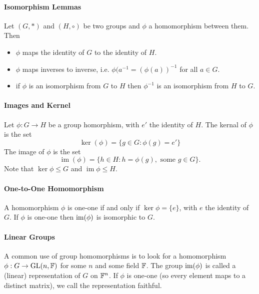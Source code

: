 \paragraph{Isomorphism Lemmas}
Let \((G, *)\) and \((H, \circ)\) be two groups and \(\phi\) a homomorphism between them. Then
\begin{itemize}
    \item \(\phi\) maps the identity of \(G\) to the identity of \(H\).
    \item \(\phi\) maps inverses to inverse, i.e. \(\phi(a^{-1} = (\phi(a))^{-1}\) for all \(a \in G\).
    \item if \(\phi\) is an isomorphism from \(G\) to \(H\) then \(\phi^{-1}\) is an isomorphism from \(H\) to \(G\).
\end{itemize}

\paragraph{Images and Kernel}
Let \(\phi: G \to H\) be a group homorphism, with \(e'\) the identity of \(H\).
The kernal of \(\phi\) is the set 
\[\ker(\phi) = \{g \in G: \phi(g) = e'\}\]
The image of \(\phi\) is the set 
\[\operatorname{im}(\phi) = \{h \in H: h = \phi(g), \text{ some } g \in G\}.\]
Note that \(\ker\phi \leq G\) and \(\operatorname{im}\phi \leq H\).

\paragraph{One-to-One Homomorphism}
A homomorphism \(\phi\) is one-one if and only if \(\ker\phi = \{e\}\), with \(e\) the identity of \(G\).
If \(\phi\) is one-one then \(\operatorname{im}(\phi)\) is isomorphic to \(G\).

\paragraph{Linear Groups}
A common use of group homomorphisms is to look for a homomorphism \(\phi: G \to \operatorname{GL}(n,\mathbb{F})\) for some \(n\) and some field \(\mathbb{F}\). The group \(\operatorname{im}(\phi)\) is called a (linear) representation of \(G\) on \(\mathbb{F}^n\). If \(\phi\) is one-one (so every element maps to a distinct matrix), we call the representation faithful. 